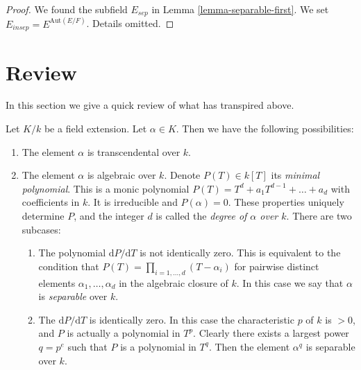 \documentclass{stacks-project}
\theoremstyle{plain}
\theoremstyle{definition}
\theoremstyle{remark}
\numberwithin{equation}{subsection}
\begin{document}
\begin{proof}
We found the subfield $E_{sep}$ in Lemma \ref{lemma-separable-first}.
We set $E_{insep} = E^{\text{Aut}(E/F)}$. Details omitted.
\end{proof}









\section{Review}
\label{section-algebraic}

\noindent
In this section we give a quick review of what has transpired above.

\medskip\noindent
Let $K/k$ be a field extension. Let $\alpha \in K$. Then we have the
following possibilities:
\begin{enumerate}
\item The element $\alpha$ is transcendental over $k$.
\item The element $\alpha$ is algebraic over $k$. Denote
$P(T) \in k[T]$ its {\it minimal polynomial}. This is a monic polynomial
$P(T) = T^d + a_1 T^{d - 1} + \ldots + a_d$ with coefficients in
$k$. It is irreducible and $P(\alpha) = 0$. These properties
uniquely determine $P$, and the integer $d$ is called the
{\it degree of $\alpha$ over $k$}. There are two subcases:
\begin{enumerate}
\item The polynomial $\text{d}P/\text{d}T$ is not identically zero.
This is equivalent to the condition that
$P(T) = \prod_{i = 1, \ldots, d} (T - \alpha_i)$ for
pairwise distinct elements $\alpha_1, \ldots, \alpha_d$
in the algebraic closure of $k$.
In this case we say that $\alpha$ is {\it separable} over $k$.
\item The $\text{d}P/\text{d}T$ is identically zero. In this case the
characteristic $p$ of $k$ is $ > 0$, and $P$ is actually a polynomial
in $T^p$. Clearly there exists a largest power $q = p^e$ such that $P$ is
a polynomial in $T^q$. Then the element $\alpha^q$ is separable over $k$.
\end{enumerate}
\end{enumerate}
\end{document}
